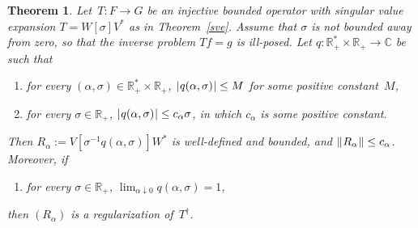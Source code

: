 \documentclass[10pt,a4paper]{amsart}
\newtheorem{theorem}{Theorem}
\def\Ce{\mathds{C}}
\def\Re{\mathds{R}}
\def\mod#1{|\mskip 1mu #1 \mskip 1mu|}
\def\norm#1{\| \mskip 1mu #1 \mskip 1mu \|}
\begin{document}
\begin{theorem}\sf
\label{spectral-reg}
Let~$T\colon F\to G$ be an injective bounded operator with
singular value expansion $T=W[\sigma]V^*$ as in Theorem~\ref{sve}.
Assume that $\sigma$ is not bounded away from zero, so that the
inverse problem $Tf=g$ is ill-posed.
Let $q\colon\Re_+^*\times\Re_+\to\Ce$ be such that
\begin{enumerate}
\item[(A1)]
for every $(\alpha,\sigma)\in\Re_+^*\times\Re_+$, 
$\mod{q(\alpha,\sigma)}\leq M$ for some positive constant~$M$,
\item[(A2)]
for every $\sigma\in\Re_+$, $\mod{q(\alpha,\sigma)}\leq c_\alpha\sigma$,
in which $c_\alpha$ is some positive constant.
\end{enumerate}
Then $R_\alpha:= V[\sigma^{-1}q(\alpha,\sigma)]W^*$ is well-defined and bounded,
and $\norm{R_\alpha}\leq c_\alpha$.
Moreover, if
\begin{enumerate}
\item[(A3)]
for every $\sigma\in\Re_+$,
$\lim_{\alpha\downarrow 0}q(\alpha,\sigma)=1$,
\end{enumerate}
then $(R_\alpha)$ is a regularization of~$T^\dagger$.
\end{theorem}
\end{document}
